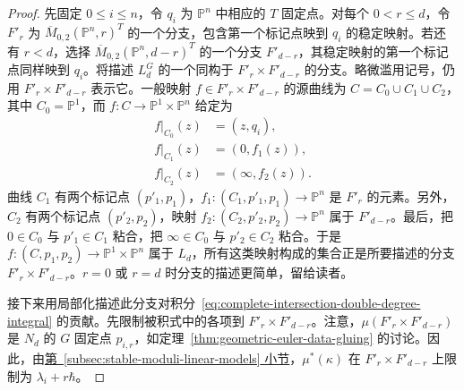 \begin{proof}
先固定 $0\le i\le n$，令 $q_i$ 为 $\mathbb P^n$ 中相应的 $T$ 固定点。对每个 $0<r\le d$，令 $F'_r$ 为 $\overline M_{0,2}(\mathbb P^n,r)^T$ 的一个分支，包含第一个标记点映到 $q_i$ 的稳定映射。若还有 $r<d$，选择 $\overline M_{0,2}(\mathbb P^n,d-r)^T$ 的一个分支 $F'_{d-r}$，其稳定映射的第一个标记点同样映到 $q_i$。将描述 $L_d^G$ 的一个同构于 $F'_r\times F'_{d-r}$ 的分支。略微滥用记号，仍用 $F'_r\times F'_{d-r}$ 表示它。一般映射 $f\in F'_r\times F'_{d-r}$ 的源曲线为 $C=C_0\cup C_1\cup C_2$，其中 $C_0=\mathbb P^1$，而 $f:C\to\mathbb P^1\times\mathbb P^n$ 给定为
\[
\begin{aligned}
f|_{C_0}(z)&=(z,q_i),\\
f|_{C_1}(z)&=(0,f_1(z)),\\
f|_{C_2}(z)&=(\infty,f_2(z)).
\end{aligned}
\]
曲线 $C_1$ 有两个标记点 $(p'_1,p_1)$，$f_1:(C_1,p'_1,p_1)\to\mathbb P^n$ 是 $F'_r$ 的元素。另外，$C_2$ 有两个标记点 $(p'_2,p_2)$，映射 $f_2:(C_2,p'_2,p_2)\to\mathbb P^n$ 属于 $F'_{d-r}$。最后，把 $0\in C_0$ 与 $p'_1\in C_1$ 粘合，把 $\infty\in C_0$ 与 $p'_2\in C_2$ 粘合。于是 $f:(C,p_1,p_2)\to\mathbb P^1\times\mathbb P^n$ 属于 $L_d$，所有这类映射构成的集合正是所要描述的分支 $F'_r\times F'_{d-r}$。$r=0$ 或 $r=d$ 时分支的描述更简单，留给读者。

接下来用局部化描述此分支对积分~\eqref{eq:complete-intersection-double-degree-integral} 的贡献。先限制被积式中的各项到 $F'_r\times F'_{d-r}$。注意，$\mu(F'_r\times F'_{d-r})$ 是 $N_d$ 的 $G$ 固定点 $p_{i,r}$，如定理~\ref{thm:geometric-euler-data-gluing} 的讨论。因此，由\hyperref[subsec:stable-moduli-linear-models]{第~\ref*{subsec:stable-moduli-linear-models} 小节}，$\mu^*(\kappa)$ 在 $F'_r\times F'_{d-r}$ 上限制为 $\lambda_i+r\hbar$。


\end{proof}
